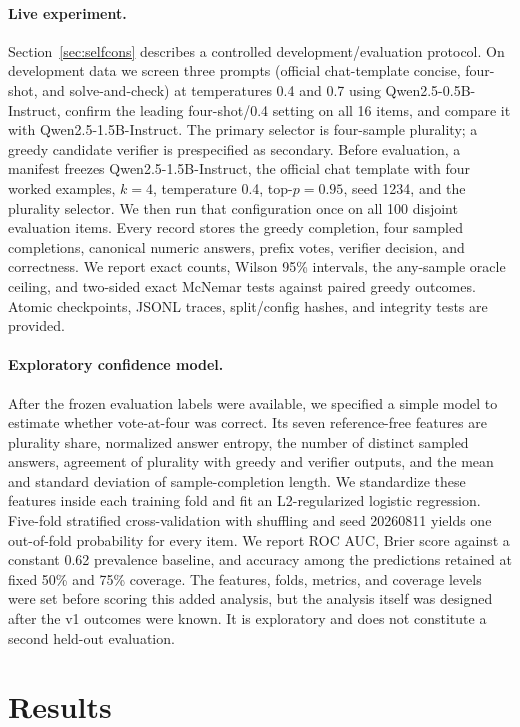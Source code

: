 \documentclass[11pt]{article}
\begin{document}
\paragraph{Live experiment.} Section~\ref{sec:selfcons} describes a controlled
development/evaluation protocol. On development data we screen three prompts
(official chat-template concise, four-shot, and solve-and-check) at
temperatures 0.4 and 0.7 using Qwen2.5-0.5B-Instruct, confirm the leading
four-shot/0.4 setting on all 16 items, and compare it with
Qwen2.5-1.5B-Instruct. The primary selector is four-sample plurality; a greedy
candidate verifier is prespecified as secondary. Before evaluation, a manifest
freezes Qwen2.5-1.5B-Instruct, the official chat template with four worked
examples, $k=4$, temperature 0.4, top-$p=0.95$, seed 1234, and the plurality
selector. We then run that configuration once on all 100 disjoint evaluation
items. Every record stores the greedy completion, four sampled completions,
canonical numeric answers, prefix votes, verifier decision, and correctness.
We report exact counts, Wilson 95\% intervals, the any-sample oracle ceiling,
and two-sided exact McNemar tests against paired greedy outcomes. Atomic
checkpoints, JSONL traces, split/config hashes, and integrity tests are
provided.
\paragraph{Exploratory confidence model.} After the frozen evaluation labels
were available, we specified a simple model to estimate whether vote-at-four
was correct. Its seven reference-free features are plurality share, normalized
answer entropy, the number of distinct sampled answers, agreement of plurality
with greedy and verifier outputs, and the mean and standard deviation of
sample-completion length. We standardize these features inside each training
fold and fit an L2-regularized logistic regression. Five-fold stratified
cross-validation with shuffling and seed 20260811 yields one out-of-fold
probability for every item. We report ROC AUC, Brier score against a constant
0.62 prevalence baseline, and accuracy among the predictions retained at fixed
50\% and 75\% coverage. The features, folds, metrics, and coverage levels were
set before scoring this added analysis, but the analysis itself was designed
after the v1 outcomes were known. It is exploratory and does not constitute a
second held-out evaluation.

\section{Results}\label{sec:results}
\end{document}
